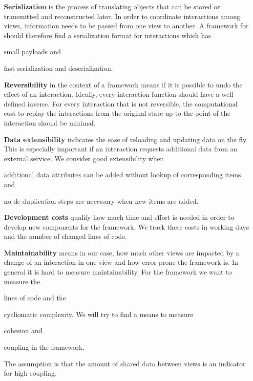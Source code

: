\textbf{Serialization} is the process of translating objects that can be stored or transmitted and reconstructed later.
In order to coordinate interactions among views, information needs to be passed from one view to another.
A framework for \cmvs{} should therefore find a serialization format for interactions which has
\begin{enumerate*}[label=(\arabic*)]
  \item
    small payloads and
  \item 
    fast serialization and deserialization.
\end{enumerate*}

\textbf{Reversibility} in the context of a \cmv{} framework means if it is possible to undo the effect of an interaction.
Ideally, every interaction function should have a well-defined inverse.
For every interaction that is not reversible, the computational cost to replay the interactions from the original state up to the point of the interaction should be minimal.

\textbf{Data extensibility} indicates the ease of reloading and updating data on the fly.
This is especially important if an interaction requests additional data from an external service.
We consider good extensibility when
\begin{enumerate*}[label=(\arabic*)]
  \item
    additional data attributes can be added without lookup of corresponding items and
  \item
    no de-duplication steps are necessary when new items are added.
\end{enumerate*}

\textbf{Development costs} qualify how much time and effort is needed in order to develop new components for the \cmv{} framework.
We track these costs in working days and the number of changed lines of code.


\textbf{Maintainability} means in our case, how much other views are impacted by a change of an interaction in one view and how error-prone the framework is.
In general it is hard to measure maintainability.
For the \cmv{} framework we want to measure the
\begin{enumerate*}[label=(\arabic*)]
  \item
    lines of code and the
  \item
    cycliomatic complexity. We will try to find a means to measure
  \item
    cohesion and
  \item
    coupling in the framework.
\end{enumerate*}
The assumption is that the amount of shared data between views is an indicator for high coupling.


